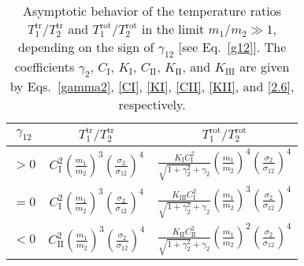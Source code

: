 \documentclass[aps,pre,reprint]{revtex4-1}
\newcommand{\tr}{{\text{tr}}}
\newcommand{\rot}{{\text{rot}}}
\begin{document}
\begin{table}
\caption{\label{tablelimit}Asymptotic behavior of the temperature ratios ${T_1^\tr}/{T_2^\tr}$ and ${T_1^\rot}/{T_2^\rot}$ in the limit $m_1/m_2\gg 1$, depending on the sign of  $\gamma_{12}$ [see Eq.\ \eqref{g12}]. The coefficients $\gamma_2$, $C_{\text{I}}$, $K_{\text{I}}$, $C_{\text{II}}$, $K_{\text{II}}$, and  $K_{\text{III}}$ are given by Eqs.\ \eqref{gamma2}, \eqref{CI}, \eqref{KI}, \eqref{CII}, \eqref{KII}, and \eqref{2.6}, respectively.}
\begin{ruledtabular}
\begin{tabular}{ccc}
$\gamma_{12}$&
${T_1^\tr}/{T_2^\tr}$&${T_1^\rot}/{T_2^\rot}$\\
\hline
$>0$&$\displaystyle{C_{\text{I}}^2\left(\frac{m_1}{m_2}\right)^3
\left(\frac{\sigma_{2}}{\sigma_{12}}\right)^4}$&$\displaystyle{\frac{K_{\text{I}}C_{\text{I}}^2}{\sqrt{1+\gamma_2^2}+\gamma_2}\left(\frac{m_1}{m_2}\right)^4
\left(\frac{\sigma_{2}}{\sigma_{12}}\right)^4}$\\
$=0$&$\displaystyle{C_{\text{I}}^2\left(\frac{m_1}{m_2}\right)^3
\left(\frac{\sigma_{2}}{\sigma_{12}}\right)^4}$&$\displaystyle{\frac{K_{\text{III}}C_{\text{I}}^2}{\sqrt{1+\gamma_2^2}+\gamma_2}\left(\frac{m_1}{m_2}\right)^3
\left(\frac{\sigma_{2}}{\sigma_{12}}\right)^4}$\\
$<0$&$\displaystyle{C_{\text{II}}^2\left(\frac{m_1}{m_2}\right)^3
\left(\frac{\sigma_{2}}{\sigma_{12}}\right)^4}$&$\displaystyle{\frac{K_{\text{II}}C_{\text{II}}^2}{\sqrt{1+\gamma_2^2}+\gamma_2}\left(\frac{m_1}{m_2}\right)^2
\left(\frac{\sigma_{2}}{\sigma_{12}}\right)^4}$\\
\end{tabular}
\end{ruledtabular}
\end{table}
\end{document}
